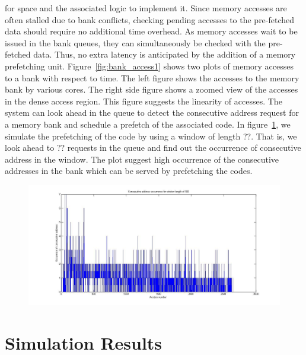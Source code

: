 for space and the associated logic to implement it. Since memory accesses are 
often stalled due to bank conflicts, checking pending accesses to the 
pre-fetched data should require no additional time overhead. As memory accesses 
wait to be issued in the bank queues, they can simultaneously be checked with 
the pre-fetched data. Thus, no extra latency is anticipated by the addition of a 
memory prefetching unit.
Figure~\ref{fig:bank_access1} shows two plots of memory accesses to a bank with 
respect to time. The left figure shows the accesses to the memory bank by 
various cores. The right side figure shows a zoomed view of the accesses in the 
dense access region. This figure suggests the linearity of accesses. The system 
can look ahead in the queue to detect the consecutive address request for a 
memory bank and schedule a prefetch of the associated code.  In 
figure~\ref{fig:queue_lookahead}, we simulate the prefetching of the code by 
using a window of length ??. That is, we look ahead to ?? requests in the queue 
and find out the occurrence of consecutive address in the window. The plot 
suggest high occurrence of the consecutive addresses in the bank which can be 
served by prefetching the codes.  
\begin{figure}[htbp]
\centering
\includegraphics[width=\linewidth]{fig/queue_lookahead.jpg}
\caption{ }
\label{fig:queue_lookahead}
\end{figure} 
 

\section{Simulation Results}
\label{sec:simulation}


